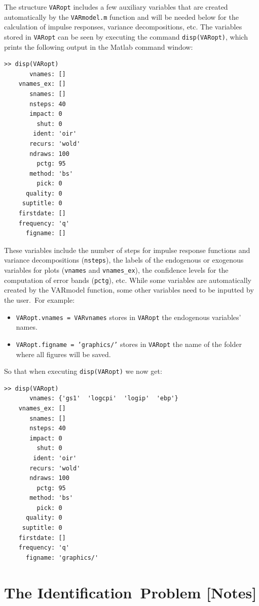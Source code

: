 \documentclass[10pt]{article}
\begin{document}
The structure \texttt{VARopt} includes a few auxiliary variables that are
created automatically by the \texttt{VARmodel.m} function and will be needed
below for the calculation of impulse responses, variance decompositions,
etc. The variables stored in \texttt{VARopt} can be seen by executing the
command \colorbox{script!80}{\texttt{disp(VARopt)}}, which prints the
following output in the Matlab command window:
\begin{verbatim}
>> disp(VARopt)
       vnames: []
    vnames_ex: []
       snames: []
       nsteps: 40
       impact: 0
         shut: 0
        ident: 'oir'
       recurs: 'wold'
       ndraws: 100
         pctg: 95
       method: 'bs'
         pick: 0
      quality: 0
     suptitle: 0
    firstdate: []
    frequency: 'q'
      figname: []
\end{verbatim}

These variables include the number of steps for impulse response functions
and variance decompositions (\texttt{nsteps}), the labels of the endogenous
or exogenous variables for plots (\texttt{vnames} and \texttt{vnames\_ex}),
the confidence levels for the computation of error bands (\texttt{pctg}),
etc. While some variables are automatically created by the VARmodel
function, some other variables need to be inputted by the user.\ For example:

\begin{itemize}
\item \colorbox{script!80}{\texttt{VARopt.vnames = VARvnames}} stores in 
\texttt{VARopt} the endogenous variables' names.

\item \colorbox{script!80}{\texttt{VARopt.figname =
'graphics/'}} stores in \texttt{VARopt} the name of the folder where all
figures will be saved.
\end{itemize}

So that when executing \colorbox{script!80}{\texttt{disp(VARopt)}} we now
get:
\begin{verbatim}
>> disp(VARopt)
       vnames: {'gs1'  'logcpi'  'logip'  'ebp'}
    vnames_ex: []
       snames: []
       nsteps: 40
       impact: 0
         shut: 0
        ident: 'oir'
       recurs: 'wold'
       ndraws: 100
         pctg: 95
       method: 'bs'
         pick: 0
      quality: 0
     suptitle: 0
    firstdate: []
    frequency: 'q'
      figname: 'graphics/'
\end{verbatim}

\section{The Identification\ Problem {\color{note} {\protect\small {[Notes]}}%
}}
\end{document}
